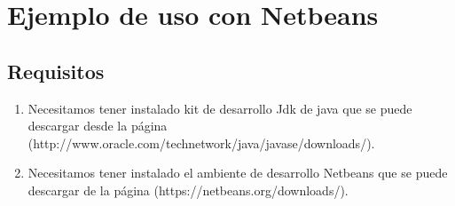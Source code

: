 \chapter{Ejemplo de uso con Netbeans}



	\section{Requisitos}

	\begin{enumerate}

	\item Necesitamos tener instalado kit de desarrollo Jdk de java que se puede descargar desde la página (http://www.oracle.com/technetwork/java/javase/downloads/).

	\item Necesitamos tener instalado el ambiente de desarrollo Netbeans que se puede descargar de la página (https://netbeans.org/downloads/).
	\end{enumerate}


